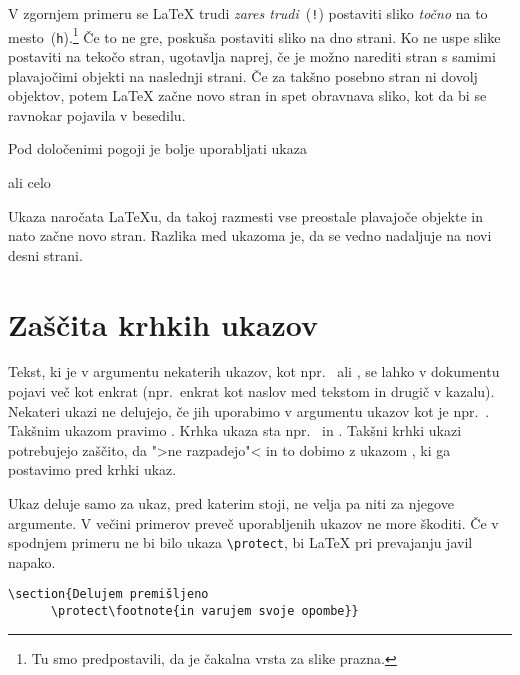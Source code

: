 \noindent V zgornjem primeru se \LaTeX{} trudi \emph{zares trudi}~(\texttt{!}) postaviti sliko \emph{točno} 
na to mesto~(\texttt{h}).\footnote{Tu smo predpostavili, da je čakalna vrsta za slike prazna.} 
Če to ne gre, poskuša postaviti sliko na dno strani. Ko ne uspe slike postaviti na tekočo stran,
ugotavlja naprej, če je možno narediti stran s samimi plavajočimi objekti na naslednji strani. 
Če za takšno posebno stran ni dovolj objektov, potem \LaTeX{} začne novo stran
in spet obravnava sliko, kot da bi se ravnokar pojavila v besedilu.


Pod določenimi pogoji je bolje uporabljati ukaza

\begin{lscommand}
 ali celo  
\end{lscommand}

\noindent Ukaza naročata \LaTeX{}u, da takoj razmesti vse preostale plavajoče objekte in nato začne novo stran. 
Razlika med ukazoma je, da se  vedno nadaljuje na novi desni strani.

\section{Zaščita krhkih ukazov}

Tekst, ki je v argumentu nekaterih ukazov, kot npr.~ ali , se lahko v dokumentu 
pojavi več kot enkrat (npr.~enkrat kot naslov med tekstom in drugič v kazalu). Nekateri ukazi
ne delujejo, če jih uporabimo v argumentu ukazov kot je npr.~. Takšnim ukazom
pravimo . 
Krhka ukaza sta npr.~ in . Takšni krhki ukazi potrebujejo 
zaščito, da ">ne razpadejo"< in to dobimo z ukazom , ki ga postavimo pred krhki ukaz.

Ukaz  deluje samo za ukaz, pred katerim stoji, ne velja pa niti za njegove argumente. V 
večini primerov preveč uporabljenih ukazov  ne more škoditi. Če v spodnjem primeru ne bi 
bilo ukaza \verb|\protect|, bi \LaTeX{} pri prevajanju javil napako.

\begin{code}
\verb|\section{Delujem premišljeno|\\
\verb|      \protect\footnote{in varujem svoje opombe}}|
\end{code}


